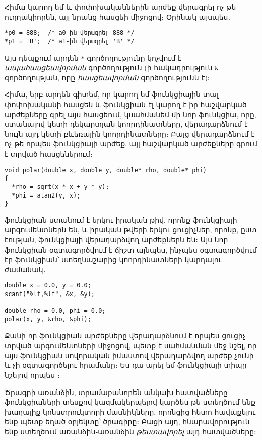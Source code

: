 Հիմա կարող եմ  և  փոփոխականներին արժեք վերագրել ոչ թե
ուղղակիորեն, այլ նրանց հասցեի միջոցով։ Օրինակ այսպես․

\begin{Verbatim}
*p0 = 888;  /* a0-ին վերագրել 888 */
*p1 = 'B';  /* a1-ին վերագրել 'B' */
\end{Verbatim}

Այս դեպքում արդեն \verb|*| գործողությունը կոչվում է \emph{ապահասցեավորման}
գործողություն (ի հակադրություն \verb|&| գործողության, որը \emph{հասցեավորման}
գործողությունն է)։

Հիմա, երբ արդեն գիտեմ, որ կարող եմ ֆունկցիային տալ փոփոխականի հասցեն և
ֆունկցիան էլ կարող է իր հաշվարկած արժեքները գրել այս հասցեում, կսահմանեմ
մի նոր ֆունկցիա, որը, ստանալով կետի դեկարտյան կոորդինատները, վերադարձնում
է նույն այդ կետի բևեռային կոորդինատները։ Բայց վերադարձնում է ոչ թե որպես
ֆունկցիայի արժեք, այլ հաշվարկած արժեքները գրում է տրված հասցեներում։

\begin{Verbatim}
void polar(double x, double y, double* rho, double* phi)
{
  *rho = sqrt(x * x + y * y);
  *phi = atan2(y, x);
}
\end{Verbatim}

 ֆունկցիան ստանում է երկու իրական թիվ, որոնք ֆունկցիայի
արգումենտներն են, և իրական թվերի երկու ցուցիչներ, որոնք, ըստ էության,
ֆունկցիայի վերադարձվող արժեքներն են։ Այս նոր ֆունկցիան օգտագործվում է
ճիշտ այնպես, ինչպես օգտագործվում էր  ֆունկցիան՝ ստեղնաշարից
կոորդինատների կարդալու ժամանակ․

\begin{Verbatim}
double x = 0.0, y = 0.0;
scanf("%lf,%lf", &x, &y);

double rho = 0.0, phi = 0.0;
polar(x, y, &rho, &phi);
\end{Verbatim}

Քանի որ  ֆունկցիան արժեքները վերադարձնում է որպես ցուցիչ
տրված արգումենտների միջոցով, պետք է սահմանման մեջ նշել, որ այս ֆունկցիան
սովորական իմաստով վերադարձվող արժեք չունի և չի օգտագործելու 
հրամանը։ Ես դա արել եմ ֆունկցիայի տիպը նշելով որպես ։


Ծրագրի առանձին, տրամաբանորեն անկախ հատվածները ֆունկցիաների տեսքով
կազմակերպելով կարծես թե ստեղծում ենք խաղալիք կոնստրուկտորի մասնիկները,
որոնցից հետո հավաքելու ենք պետք եղած օբյեկտը՝ ծրագիրը։ Բացի այդ,
հնարավորություն ենք ստեղծում առանձին֊առանձին \emph{թեստավորել} այդ
հատվածները։


